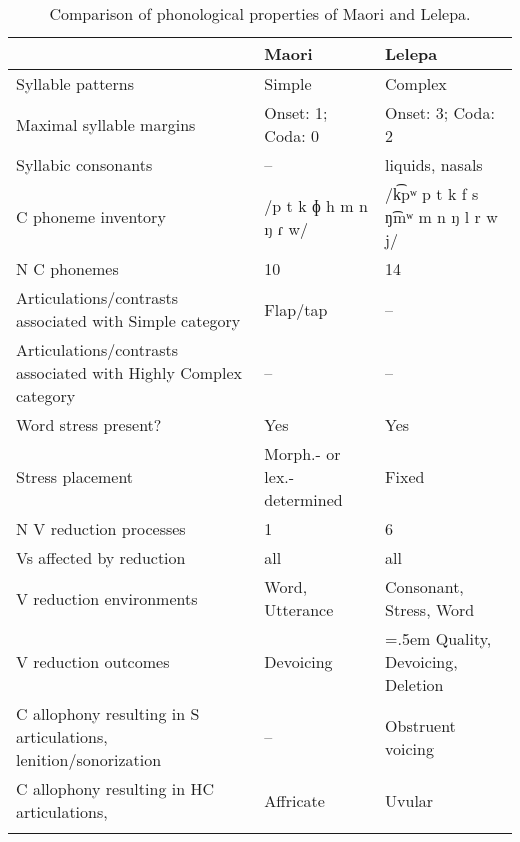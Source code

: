 \begin{table}
\small
\begin{tabularx}{\textwidth}{IQQ}
\lsptoprule
 & {Maori} & {Lelepa}\\
 \midrule 
 {Syllable patterns} & Simple & Complex\\
\tablevspace
 {Maximal syllable margins} & Onset: 1; Coda: 0 & Onset: 3; Coda: 2\\
\tablevspace
 {Syllabic consonants} & -- & liquids, nasals\\
\tablevspace
 {C phoneme inventory} & /p t k ɸ h m n ŋ ɾ w/ & /k͡pʷ p t k f s ŋ͡mʷ m n ŋ l r w j/\\
\tablevspace
 {N C phonemes} & 10 & 14\\
\tablevspace
 {Articulations/contrasts associated with {Simple}} {category} & {Flap/tap} & {--}\\
\tablevspace
 {Articulations/contrasts associated with {Highly Complex}} {category} & {--} & {--}\\
\tablevspace
 {Word stress present?} & {Yes} & {Yes}\\
\tablevspace
 {Stress placement} & {Morph.- or lex.-determined} & {Fixed}\\
\tablevspace
 {N V reduction processes} & {1} & {6}\\
\tablevspace
 {Vs affected by reduction}  & {all} & {all}\\
\tablevspace
 {V reduction environments} & {Word, Utterance} & {Consonant, Stress, Word}\\
\tablevspace
 {V reduction outcomes} & {Devoicing} & \hangindent=.5em Quality, Devoicing, Deletion\\
\tablevspace
 {C allophony resulting in S articulations, lenition/sonorization} & {--} & { {Obstruent voicing}}\\
\tablevspace
{ {C allophony resulting in HC articulations,} } & { {Affricate}} & {Uvular}\\
\lspbottomrule
\end{tabularx}
\caption{\label{tab:8.7}Comparison of phonological properties of Maori and Lelepa.}
\end{table}

